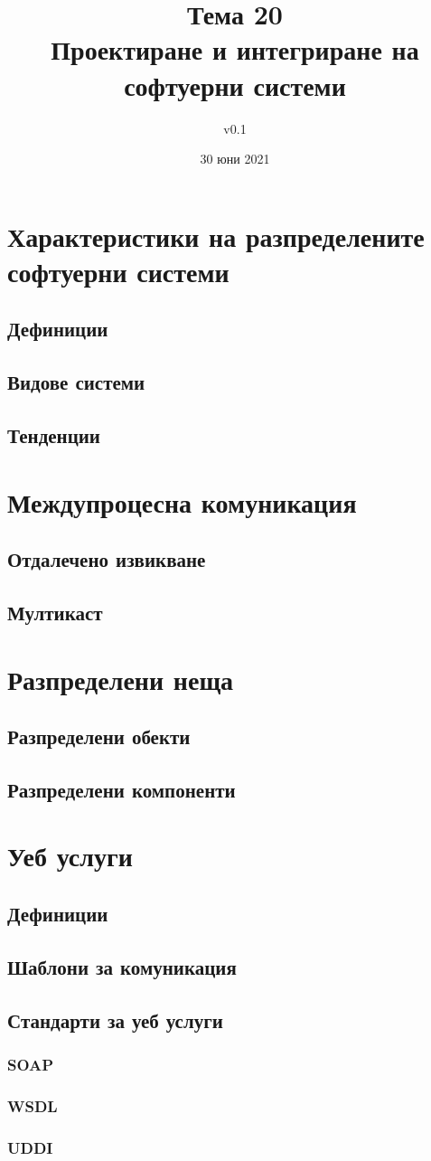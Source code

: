 \documentclass[fleqn,12pt]{article}
\title{Тема 20 \\Проектиране и интегриране на софтуерни системи}
\author{v0.1}
\date{30 юни 2021}
\begin{document}
\maketitle
\tableofcontents
\pagebreak

\section{Характеристики на разпределените софтуерни системи}
\subsection{Дефиниции}
\subsection{Видове системи}
\subsection{Тенденции}

\section{Междупроцесна комуникация}
\subsection{Отдалечено извикване}
\subsection{Мултикаст}

\section{Разпределени неща}
\subsection{Разпределени обекти}
\subsection{Разпределени компоненти}

\section{Уеб услуги}
\subsection{Дефиниции}
\subsection{Шаблони за комуникация}
\subsection{Стандарти за уеб услуги}
\subsubsection{SOAP}
\subsubsection{WSDL}
\subsubsection{UDDI}
\end{document}
